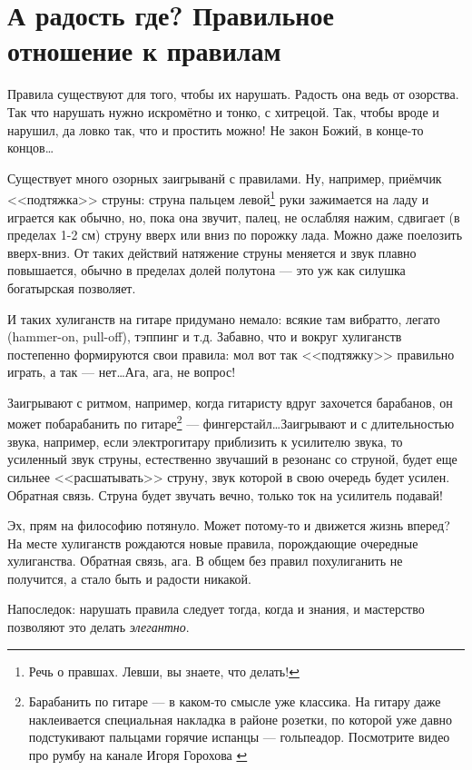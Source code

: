 \section{А радость где? Правильное отношение к правилам}
\label{ch:music:rules}

Правила существуют для того, чтобы их нарушать. Радость она ведь от озорства. Так что нарушать нужно искромётно и тонко, с хитрецой. Так, чтобы вроде и нарушил, да ловко так, что и простить можно! Не закон Божий, в конце-то концов\ldots

Существует много озорных заигрыванй с правилами. Ну, например, приёмчик <<подтяжка>> струны: струна пальцем левой\footnote{Речь о правшах. Левши, вы знаете, что делать!} руки зажимается на ладу и играется как обычно, но, пока она звучит, палец, не ослабляя нажим, сдвигает (в пределах 1-2 см) струну вверх или вниз по порожку лада. Можно даже поелозить вверх-вниз. От таких действий натяжение струны меняется и звук плавно повышается, обычно в пределах долей полутона --- это уж как силушка богатырская позволяет. 

И таких хулиганств на гитаре придумано немало: всякие там вибратто, легато (hammer-on, pull-off), тэппинг и т.д. Забавно, что и вокруг хулиганств постепенно формируются свои правила: мол вот так <<подтяжку>> правильно играть, а так --- нет\ldots Ага, ага, не вопрос!

Заигрывают с ритмом, например, когда гитаристу вдруг захочется барабанов, он может побарабанить по гитаре\footnote{Барабанить по гитаре --- в каком-то смысле уже классика. На гитару даже наклеивается специальная накладка в районе розетки, по которой уже давно подстукивают пальцами горячие испанцы --- гольпеадор. Посмотрите видео про румбу на канале Игоря Горохова \cite{url:gorohovIgor}} --- фингерстайл\ldots Заигрывают и с длительностью звука, например, если электрогитару приблизить к усилителю звука, то усиленный звук струны, естественно звучаший в резонанс со струной, будет еще сильнее <<расшатывать>> струну, звук которой в свою очередь будет усилен. Обратная связь. Струна будет звучать вечно, только ток на усилитель подавай!

Эх, прям на философию потянуло. Может потому-то и движется жизнь вперед? На месте хулиганств рождаются новые правила, порождающие очередные хулиганства. Обратная связь, ага. В общем без правил похулиганить не получится, а стало быть и радости никакой.

Напоследок: нарушать правила следует тогда, когда и знания, и мастерство позволяют это делать \emph{элегантно}.
